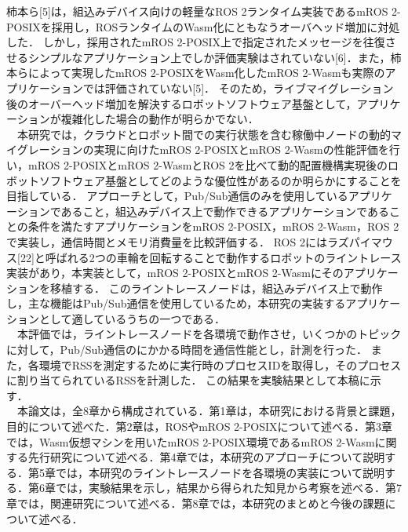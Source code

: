 柿本ら[5]は，組込みデバイス向けの軽量なROS 2ランタイム実装であるmROS 2-POSIXを採用し，ROSランタイムのWasm化にともなうオーバヘッド増加に対処した．
しかし，採用されたmROS 2-POSIX上で指定されたメッセージを往復させるシンプルなアプリケーション上でしか評価実験はされていない[6]．また，柿本らによって実現したmROS 2-POSIXをWasm化したmROS 2-Wasmも実際のアプリケーションでは評価されていない[5]．
そのため，ライブマイグレーション後のオーバーヘッド増加を解決するロボットソフトウェア基盤として，アプリケーションが複雑化した場合の動作が明らかでない．
\\　本研究では，クラウドとロボット間での実行状態を含む稼働中ノードの動的マイグレーションの実現に向けたmROS 2-POSIXとmROS 2-Wasmの性能評価を行い，mROS 2-POSIXとmROS 2-WasmとROS 2を比べて動的配置機構実現後のロボットソフトウェア基盤としてどのような優位性があるのか明らかにすることを目指している．
アプローチとして，Pub/Sub通信のみを使用しているアプリケーションであること，組込みデバイス上で動作できるアプリケーションであることの条件を満たすアプリケーションをmROS 2-POSIX，mROS 2-Wasm，ROS 2で実装し，通信時間とメモリ消費量を比較評価する．
ROS 2にはラズパイマウス[22]と呼ばれる2つの車輪を回転することで動作するロボットのライントレース実装があり，本実装として，mROS 2-POSIXとmROS 2-Wasmにそのアプリケーションを移植する．
このライントレースノードは，組込みデバイス上で動作し，主な機能はPub/Sub通信を使用しているため，本研究の実装するアプリケーションとして適しているうちの一つである．
\\　本評価では，ライントレースノードを各環境で動作させ，いくつかのトピックに対して，Pub/Sub通信のにかかる時間を通信性能とし，計測を行った．
また，各環境でRSSを測定するために実行時のプロセスIDを取得し，そのプロセスに割り当てられているRSSを計測した．
この結果を実験結果として本稿に示す．
\\　本論文は，全8章から構成されている．第1章は，本研究における背景と課題，目的について述べた．第2章は，ROSやmROS 2-POSIXについて述べる．第3章では，Wasm仮想マシンを用いたmROS 2-POSIX環境であるmROS 2-Wasmに関する先行研究について述べる．第4章では，本研究のアプローチについて説明する．第5章では，本研究のライントレースノードを各環境の実装について説明する．第6章では，実験結果を示し，結果から得られた知見から考察を述べる．第7章では，関連研究について述べる．第8章では，本研究のまとめと今後の課題について述べる．
